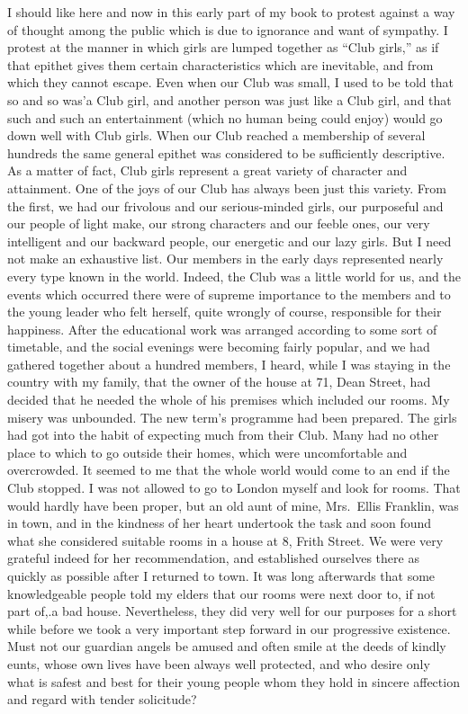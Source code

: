 I should like here and now in this early part of my
book to protest against a way of thought among the public
which is due to ignorance and want of sympathy. I protest at the manner in which girls are lumped together as
“Club girls,” as if that epithet gives them certain characteristics
which are inevitable, and from which they cannot
escape. Even when our Club was small, I used to be told
that so and so was’a Club girl, and another person was
just like a Club girl, and that such and such an entertainment
(which no human being could enjoy) would go
down well with Club girls. When our Club reached a
membership of several hundreds the same general epithet
was considered to be sufficiently descriptive. As a matter
of fact, Club girls represent a great variety of character
and attainment. One of the joys of our Club has always
been just this variety. From the first, we had our frivolous
and our serious-minded girls, our purposeful and our
people of light make, our strong characters and our feeble
ones, our very intelligent and our backward people, our
energetic and our lazy girls. But I need not make an
exhaustive list. Our members in the early days represented
nearly every type known in the world. Indeed,
the Club was a little world for us, and the events which
occurred there were of supreme importance to the members
and to the young leader who felt herself, quite
wrongly of course, responsible for their happiness.
After the educational work was arranged according
to some sort of timetable, and the social evenings were
becoming fairly popular, and we had gathered together
about a hundred members, I heard, while I was staying
in the country with my family, that the owner of the
house at 71, Dean Street, had decided that he needed
the whole of his premises which included our rooms. My
misery was unbounded. The new term’s programme had
been prepared. The girls had got into the habit of expecting
much from their Club. Many had no other place to
which to go outside their homes, which were uncomfortable
and overcrowded. It seemed to me that the whole
world would come to an end if the Club stopped. I was
not allowed to go to London myself and look for rooms.
That would hardly have been proper, but an old aunt
of mine, Mrs.\ Ellis Franklin, was in town, and in the kindness
of her heart undertook the task and soon found what
she considered suitable rooms in a house at 8, Frith Street.
We were very grateful indeed for her recommendation,
and established ourselves there as quickly as possible after
I returned to town. It was long afterwards that some
knowledgeable people told my elders that our rooms were
next door to, if not part of,.a bad house. Nevertheless,
they did very well for our purposes for a short while
before we took a very important step forward in our progressive
existence. Must not our guardian angels be
amused and often smile at the deeds of kindly eunts,
whose own lives have been always well protected, and
who desire only what is safest and best for their young
people whom they hold in sincere affection and regard
with tender solicitude?
